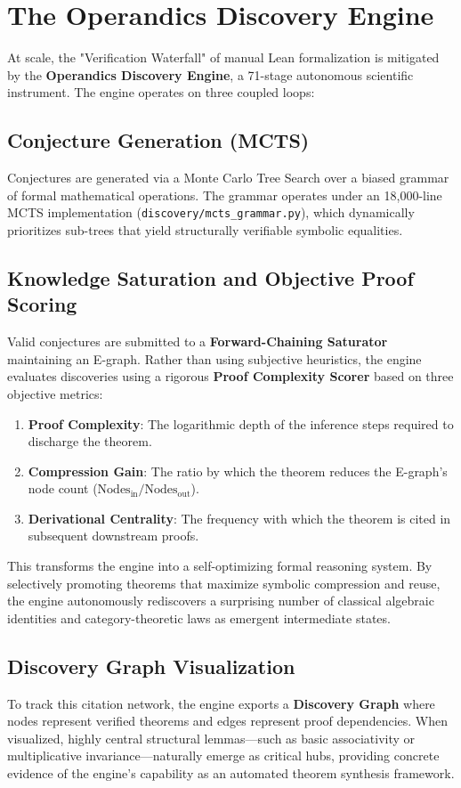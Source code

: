 \documentclass[11pt,a4paper,twocolumn]{article}
\theoremstyle{definition}
\theoremstyle{remark}
\begin{document}
\section{The Operandics Discovery Engine}
\label{sec:engine}

At scale, the "Verification Waterfall" of manual Lean formalization is
mitigated by the \textbf{Operandics Discovery Engine}, a 71-stage autonomous
scientific instrument. The engine operates on three coupled loops:

\subsection{Conjecture Generation (MCTS)}
Conjectures are generated via a Monte Carlo Tree Search over a biased grammar
of formal mathematical operations. The grammar operates under an 18,000-line MCTS implementation (\texttt{discovery/mcts\_grammar.py}), which dynamically prioritizes sub-trees that yield structurally verifiable symbolic equalities.

\subsection{Knowledge Saturation and Objective Proof Scoring}
Valid conjectures are submitted to a \textbf{Forward-Chaining Saturator} maintaining an E-graph. Rather than using subjective heuristics, the engine evaluates discoveries using a rigorous \textbf{Proof Complexity Scorer} based on three objective metrics:
\begin{enumerate}[nosep]
    \item \textbf{Proof Complexity}: The logarithmic depth of the inference steps required to discharge the theorem.
    \item \textbf{Compression Gain}: The ratio by which the theorem reduces the E-graph's node count ($\text{Nodes}_{\text{in}} / \text{Nodes}_{\text{out}}$).
    \item \textbf{Derivational Centrality}: The frequency with which the theorem is cited in subsequent downstream proofs.
\end{enumerate}

This transforms the engine into a self-optimizing formal reasoning system. By selectively promoting theorems that maximize symbolic compression and reuse, the engine autonomously rediscovers a surprising number of classical algebraic identities and category-theoretic laws as emergent intermediate states.

\subsection{Discovery Graph Visualization}
To track this citation network, the engine exports a \textbf{Discovery Graph} where nodes represent verified theorems and edges represent proof dependencies. When visualized, highly central structural lemmas—such as basic associativity or multiplicative invariance—naturally emerge as critical hubs, providing concrete evidence of the engine's capability as an automated theorem synthesis framework.
\end{document}
